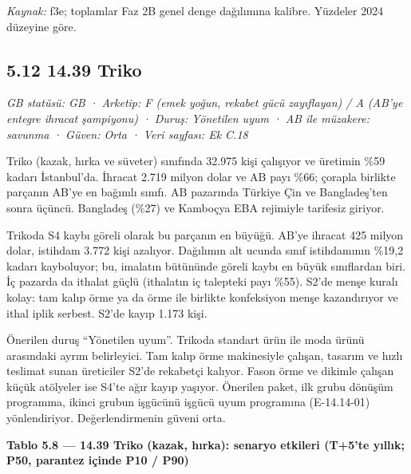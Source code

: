 \endgroup

\emph{Kaynak:} \etiketT{} f3e; toplamlar Faz 2B genel denge dağılımına kalibre. Yüzdeler 2024 düzeyine göre.

\hypertarget{nace_kartlar_13-15-512-1439-triko}{%
\subsection{5.12 14.39 Triko}\label{nace_kartlar_13-15-512-1439-triko}}

\emph{GB statüsü: GB · Arketip: F (emek yoğun, rekabet gücü zayıflayan) / A (AB'ye entegre ihracat şampiyonu) · Duruş: Yönetilen uyum · AB ile müzakere: savunma · Güven: Orta · Veri sayfası: Ek C.18}

Triko (kazak, hırka ve süveter) sınıfında 32.975 kişi çalışıyor ve üretimin \%59 kadarı İstanbul'da. İhracat 2.719 milyon dolar ve AB payı \%66; çorapla birlikte parçanın AB'ye en bağımlı sınıfı. AB pazarında Türkiye Çin ve Bangladeş'ten sonra üçüncü. Bangladeş (\%27) ve Kamboçya EBA rejimiyle tarifesiz giriyor.

Trikoda S4 kaybı göreli olarak bu parçanın en büyüğü. AB'ye ihracat 425 milyon dolar, istihdam 3.772 kişi azalıyor. Dağılımın alt ucunda sınıf istihdamının \%19,2 kadarı kayboluyor; bu, imalatın bütününde göreli kaybı en büyük sınıflardan biri. İç pazarda da ithalat güçlü (ithalatın iç talepteki payı \%55). S2'de menşe kuralı kolay: tam kalıp örme ya da örme ile birlikte konfeksiyon menşe kazandırıyor ve ithal iplik serbest. S2'de kayıp 1.173 kişi.

Önerilen duruş ``Yönetilen uyum''. Trikoda standart ürün ile moda ürünü arasındaki ayrım belirleyici. Tam kalıp örme makinesiyle çalışan, tasarım ve hızlı teslimat sunan üreticiler S2'de rekabetçi kalıyor. Fason örme ve dikimle çalışan küçük atölyeler ise S4'te ağır kayıp yaşıyor. Önerilen paket, ilk grubu dönüşüm programına, ikinci grubun işgücünü işgücü uyum programına (E-14.14-01) yönlendiriyor. Değerlendirmenin güveni orta.


\textbf{Tablo 5.8 --- 14.39 Triko (kazak, hırka): senaryo etkileri (T+5'te yıllık; P50, parantez içinde P10 / P90)}

\nopagebreak[4]

\begingroup\gbtablo\small


